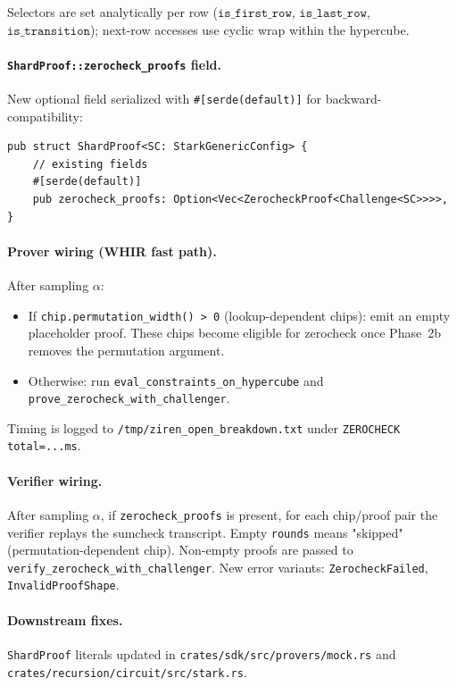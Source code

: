 Selectors are set analytically per row ($\texttt{is\_first\_row}$,
$\texttt{is\_last\_row}$, $\texttt{is\_transition}$); next-row accesses use
cyclic wrap within the hypercube.

\paragraph{\texttt{ShardProof::zerocheck\_proofs} field.}
New optional field serialized with \texttt{\#[serde(default)]} for
backward-compatibility:
\begin{verbatim}
pub struct ShardProof<SC: StarkGenericConfig> {
    // existing fields
    #[serde(default)]
    pub zerocheck_proofs: Option<Vec<ZerocheckProof<Challenge<SC>>>>,
}
\end{verbatim}

\paragraph{Prover wiring (WHIR fast path).}
After sampling $\alpha$:
\begin{itemize}
  \item If \texttt{chip.permutation\_width() > 0} (lookup-dependent chips):
        emit an empty placeholder proof.  These chips become eligible for
        zerocheck once Phase~2b removes the permutation argument.
  \item Otherwise: run \texttt{eval\_constraints\_on\_hypercube} and
        \texttt{prove\_zerocheck\_with\_challenger}.
\end{itemize}
Timing is logged to \texttt{/tmp/ziren\_open\_breakdown.txt} under
\texttt{ZEROCHECK total=...ms}.

\paragraph{Verifier wiring.}
After sampling $\alpha$, if \texttt{zerocheck\_proofs} is present, for each
chip/proof pair the verifier replays the sumcheck transcript.  Empty
\texttt{rounds} means "skipped" (permutation-dependent chip).  Non-empty
proofs are passed to \texttt{verify\_zerocheck\_with\_challenger}.  New
error variants: \texttt{ZerocheckFailed}, \texttt{InvalidProofShape}.

\paragraph{Downstream fixes.}
\texttt{ShardProof} literals updated in
\texttt{crates/sdk/src/provers/mock.rs} and
\texttt{crates/recursion/circuit/src/stark.rs}.

